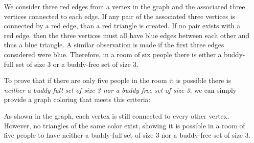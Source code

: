\documentclass[12pt]{article}%
\begin{document}
We consider three red edges from a vertex in the graph and the associated three vertices connected to each edge. If any pair of the associated three vertices is connected by a red edge, than a red triangle is created. If no pair exists with a red edge, then the three vertices must all have blue edges between each other and thus a blue triangle. A similar observation is made if the first three edges considered were blue. Therefore, in a room of six people there is either a buddy-full set of size 3 or a buddy-free set of size 3.

To prove that if there are only five people in the room it is possible there is \emph{neither a buddy-full set of size 3 nor a buddy-free set of size 3}, we can simply provide a graph coloring that meets this criteria:

\begin{center}
\newcommand\size{3}%
\end{center}

As shown in the graph, each vertex is still connected to every other vertex. However, no triangles of the same color exist, showing it is possible in a room of five people to have neither a buddy-full set of size 3 nor a buddy-free set of size 3.
\end{document}
